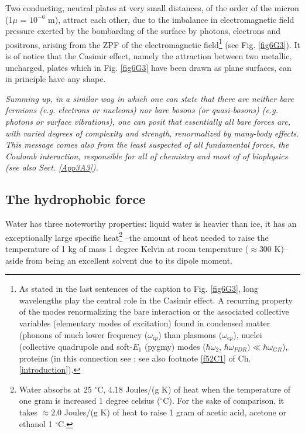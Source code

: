 \begin{subappendices}
Two conducting,
neutral plates at very small distances, of the order of the micron (1$\mu$ = $10^{-6}$ m), attract each
other, due to the imbalance in electromagnetic field pressure exerted by the bombarding
of  the surface by photons, electrons and positrons, arising from the ZPF of the electromagnetic field\footnote{As stated in the last sentences of the caption to Fig. \ref{fig6G3}, long wavelengths play the central role in the Casimir effect. A recurring property of the modes renormalizing the bare interaction or the associated collective variables (elementary modes of excitation) found in condensed matter (phonons of much lower frequency ($\omega_{ip}$) than plasmons ($\omega_{ep}$), nuclei (collective quadrupole and soft-$E_1$ (pygmy) modes ($\hbar\omega_2$, $\hbar\omega_{PDR})\ll\hbar\omega_{GR}$), proteins (in this connection see \cite{Micheletti:04,Micheletti:01,Micheletti:02,Hamacher:10}; see also footnote \ref{f52C1} of Ch. \ref{introduction}).}
(see Fig. \ref{fig6G3}). It is of notice that the Casimir effect, namely the attraction between two metallic,
uncharged, plates which in Fig. \ref{fig6G3} have been drawn  as plane surfaces, can in
principle have any shape. 

\emph{Summing up, in a similar way in which one can state that there are neither bare fermions (e.g. electrons or nucleons) nor bare  bosons (or quasi-bosons) (e.g. photons or surface vibrations),  one can posit that essentially all  bare
forces are, with varied degrees of complexity and strength, renormalized 
by many-body effects. This message comes also from  the least suspected of all fundamental forces, the Coulomb interaction, responsible for all of chemistry and most of of biophysics (see also  Sect. \ref{App3A3}).}
\subsection{The hydrophobic force}
Water has three noteworthy properties: liquid water is heavier than ice, it has an exceptionally large specific heat\footnote{Water absorbs  at 25 $^\circ$C, 4.18 Joules/(g K) of heat when the temperature of one gram is increased 1 degree celsius ($^\circ$C). For the sake of comparison, it takes $\approx 2.0$ Joules/(g K) of heat to raise 1 gram of acetic acid, acetone or ethanol 1 $^\circ$C.} --the amount of heat needed to raise the temperature of 1 kg of mass 1 degree Kelvin at room temperature ($\approx$300 K)-- aside from being an excellent solvent due to its dipole moment.



\end{subappendices}
